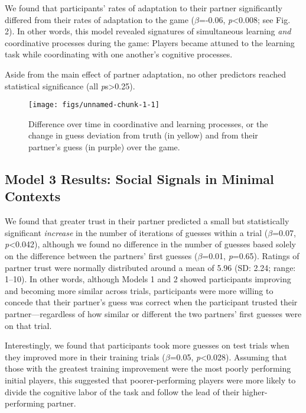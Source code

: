\documentclass[10pt, letterpaper]{article}
\newenvironment{CodeChunk}{}{}
\begin{document}
We found that participants' rates of adaptation to their partner
significantly differed from their rates of adaptation to the game
(\emph{\(\beta\)}=-0.06, \emph{p}\textless{}0.008; see Fig. 2). In other
words, this model revealed signatures of simultaneous learning
\emph{and} coordinative processes during the game: Players became
attuned to the learning task while coordinating with one another's
cognitive processes.

Aside from the main effect of partner adaptation, no other predictors
reached statistical significance (all \emph{p}s\textgreater{}0.25).

\begin{CodeChunk}
\begin{figure}[H]

\texttt{[image: figs/unnamed-chunk-1-1]} \hfill{}

\caption[Difference over time in coordinative and learning processes, or the change in guess deviation from truth (in yellow) and from their partner's guess (in purple) over the game]{Difference over time in coordinative and learning processes, or the change in guess deviation from truth (in yellow) and from their partner's guess (in purple) over the game.}\label{fig:unnamed-chunk-1}
\end{figure}
\end{CodeChunk}

\subsection{Model 3 Results: Social Signals in Minimal
Contexts}\label{model-3-results-social-signals-in-minimal-contexts}

We found that greater trust in their partner predicted a small but
statistically significant \emph{increase} in the number of iterations of
guesses within a trial (\emph{\(\beta\)}=0.07,
\emph{p}\textless{}0.042), although we found no difference in the number
of guesses based solely on the difference between the partners' first
guesses (\emph{\(\beta\)}=0.01, \emph{p}=0.65). Ratings of partner trust
were normally distributed around a mean of 5.96 (SD: 2.24; range:
1--10). In other words, although Models 1 and 2 showed participants
improving and becoming more similar across trials, participants were
more willing to concede that their partner's guess was correct when the
participant trusted their partner---regardless of how similar or
different the two partners' first guesses were on that trial.

Interestingly, we found that participants took more guesses on test
trials when they improved more in their training trials
(\emph{\(\beta\)}=0.05, \emph{p}\textless{}0.028). Assuming that those
with the greatest training improvement were the most poorly performing
initial players, this suggested that poorer-performing players were more
likely to divide the cognitive labor of the task and follow the lead of
their higher-performing partner.
\end{document}
